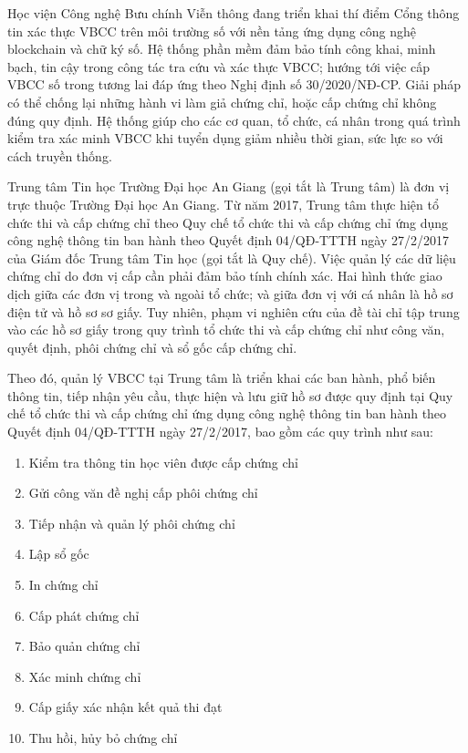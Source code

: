 Học viện Công nghệ Bưu chính Viễn thông đang triển khai thí điểm Cổng thông tin xác thực VBCC trên môi trường số với nền tảng ứng dụng công nghệ blockchain và chữ ký số. Hệ thống phần mềm đảm bảo tính công khai, minh bạch, tin cậy trong công tác tra cứu và xác thực VBCC; hướng tới việc cấp VBCC số trong tương lai đáp ứng theo Nghị định số 30/2020/NĐ-CP. Giải pháp có thể chống lại những hành vi làm giả chứng chỉ, hoặc cấp chứng chỉ không đúng quy định. Hệ thống giúp cho các cơ quan, tổ chức, cá nhân trong quá trình kiểm tra xác minh VBCC khi tuyển dụng giảm nhiều thời gian, sức lực so với cách truyền thống.

Trung tâm Tin học Trường Đại học An Giang (gọi tắt là Trung tâm) là đơn vị trực thuộc Trường Đại học An Giang. Từ năm 2017, Trung tâm thực hiện tổ chức thi và cấp chứng chỉ theo Quy chế tổ chức thi và cấp chứng chỉ ứng dụng công nghệ thông tin ban hành theo Quyết định 04/QĐ-TTTH ngày 27/2/2017 của Giám đốc Trung tâm Tin học (gọi tắt là Quy chế). Việc quản lý các dữ liệu chứng chỉ do đơn vị cấp cần phải đảm bảo tính chính xác. Hai hình thức giao dịch giữa các đơn vị trong và ngoài tổ chức; và giữa đơn vị với cá nhân là hồ sơ điện tử và hồ sơ sơ giấy. Tuy nhiên, phạm vi nghiên cứu của đề tài chỉ tập trung vào các hồ sơ giấy trong quy trình tổ chức thi và cấp chứng chỉ như công văn, quyết định, phôi chứng chỉ và sổ gốc cấp chứng chỉ.

Theo đó, quản lý VBCC tại Trung tâm là triển khai các ban hành, phổ biến thông tin, tiếp nhận yêu cầu, thực hiện và lưu giữ hồ sơ được quy định tại Quy chế tổ chức thi và cấp chứng chỉ ứng dụng công nghệ thông tin ban hành theo Quyết định 04/QĐ-TTTH ngày 27/2/2017, bao gồm các quy trình như sau:

\begin{enumerate}
\item Kiểm tra thông tin học viên được cấp chứng chỉ
\item Gửi công văn đề nghị cấp phôi chứng chỉ
\item Tiếp nhận và quản lý phôi chứng chỉ
\item Lập sổ gốc
\item In chứng chỉ
\item Cấp phát chứng chỉ
\item Bảo quản chứng chỉ
\item Xác minh chứng chỉ
\item Cấp giấy xác nhận kết quả thi đạt
\item Thu hồi, hủy bỏ chứng chỉ
\end{enumerate}

